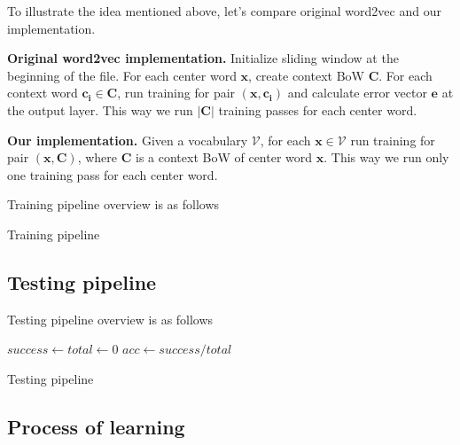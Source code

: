 \documentclass{article}
\newcommand{\SetAlgoStyle}{
	\SetAlgoNoLine
	\SetAlgoNoEnd
	\DontPrintSemicolon
}
\begin{document}
\medbreak

To illustrate the idea mentioned above, let's compare original word2vec and our implementation.

\textbf{Original word2vec implementation.}
Initialize sliding window at the beginning of the file. For each center word $\boldsymbol{x}$, create context BoW $\boldsymbol{C}$. For each context word $\boldsymbol{c_i} \in \boldsymbol{C}$, run training for pair $(\boldsymbol{x}, \boldsymbol{c_i})$ and calculate error vector $\boldsymbol{e}$ at the output layer. This way we run $|\boldsymbol{C}|$ training passes for each center word.

\textbf{Our implementation.}
Given a vocabulary $\mathcal{V}$, for each $\boldsymbol{x} \in \mathcal{V}$ run training for pair $(\boldsymbol{x}, \boldsymbol{C})$, where $\boldsymbol{C}$ is a context BoW of center word $\boldsymbol{x}$. This way we run only one training pass for each center word.

Training pipeline overview is as follows

\begin{algorithm}[H]
	\SetAlgoStyle
	\caption{Training pipeline}
\end{algorithm}

\subsection{Testing pipeline}

Testing pipeline overview is as follows

\begin{algorithm}[H]
	\SetAlgoStyle
	$success \gets total \gets 0$\;
	$acc \gets success / total$\;
	\caption{Testing pipeline}
\end{algorithm}

\subsection{Process of learning}
\end{document}
